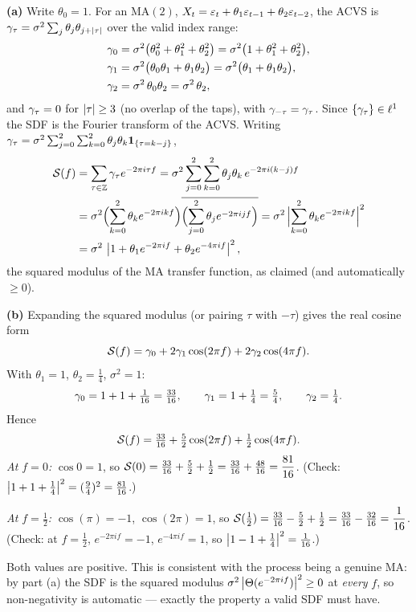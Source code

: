 \documentclass[11pt]{article}
\begin{document}
\textbf{(a)} Write $\theta_0=1$. For an $\mathrm{MA}(2)$, $X_t=\varepsilon_t+\theta_1\varepsilon_{t-1}+\theta_2\varepsilon_{t-2}$, the ACVS is $\gamma_\tau=\sigma^2\sum_{j}\theta_j\theta_{j+\left\lvert \tau \right\rvert}$ over the valid index range:
\[
\begin{aligned}
\gamma_0&=\sigma^2\bigl(\theta_0^2+\theta_1^2+\theta_2^2\bigr)=\sigma^2\bigl(1+\theta_1^2+\theta_2^2\bigr),\\
\gamma_1&=\sigma^2\bigl(\theta_0\theta_1+\theta_1\theta_2\bigr)=\sigma^2\bigl(\theta_1+\theta_1\theta_2\bigr),\\
\gamma_2&=\sigma^2\,\theta_0\theta_2=\sigma^2\,\theta_2,
\end{aligned}
\]
and $\gamma_\tau=0$ for $\left\lvert \tau \right\rvert\ge3$ (no overlap of the taps), with $\gamma_{-\tau}=\gamma_\tau$. Since $\{\gamma_\tau\}\in\ell^1$ the SDF is the Fourier transform of the ACVS. Writing $\gamma_\tau=\sigma^2\sum_{j=0}^{2}\sum_{k=0}^{2}\theta_j\theta_k\mathbf{1}_{\{\tau=k-j\}}$,
\[
\begin{aligned}
\mathcal{S}(f)&=\sum_{\tau\in\mathbb{Z}}\gamma_\tau e^{-2\pi i\tau f}
=\sigma^2\sum_{j=0}^{2}\sum_{k=0}^{2}\theta_j\theta_k\,e^{-2\pi i(k-j)f}\\
&=\sigma^2\Bigl(\sum_{k=0}^{2}\theta_k e^{-2\pi i k f}\Bigr)\overline{\Bigl(\sum_{j=0}^{2}\theta_j e^{-2\pi i j f}\Bigr)}
=\sigma^2\,\Bigl|\sum_{k=0}^{2}\theta_k e^{-2\pi i k f}\Bigr|^2\\
&=\sigma^2\,\left\lvert 1+\theta_1 e^{-2\pi i f}+\theta_2 e^{-4\pi i f} \right\rvert^2 ,
\end{aligned}
\]
the squared modulus of the MA transfer function, as claimed (and automatically $\ge0$).

\textbf{(b)} Expanding the squared modulus (or pairing $\tau$ with $-\tau$) gives the real cosine form
\[
\mathcal{S}(f)=\gamma_0+2\gamma_1\cos(2\pi f)+2\gamma_2\cos(4\pi f).
\]
With $\theta_1=1$, $\theta_2=\tfrac14$, $\sigma^2=1$:
\[
\gamma_0=1+1+\tfrac1{16}=\tfrac{33}{16},\qquad
\gamma_1=1+\tfrac14=\tfrac54,\qquad
\gamma_2=\tfrac14 .
\]
Hence
\[
\mathcal{S}(f)=\tfrac{33}{16}+\tfrac52\cos(2\pi f)+\tfrac12\cos(4\pi f).
\]
\emph{At $f=0$:} $\cos0=1$, so $\mathcal{S}(0)=\tfrac{33}{16}+\tfrac52+\tfrac12=\tfrac{33}{16}+\tfrac{48}{16}=\dfrac{81}{16}$. (Check: $\left\lvert 1+1+\tfrac14 \right\rvert^2=(\tfrac94)^2=\tfrac{81}{16}$.)

\emph{At $f=\tfrac12$:} $\cos(\pi)=-1$, $\cos(2\pi)=1$, so $\mathcal{S}(\tfrac12)=\tfrac{33}{16}-\tfrac52+\tfrac12=\tfrac{33}{16}-\tfrac{32}{16}=\dfrac{1}{16}$. (Check: at $f=\tfrac12$, $e^{-2\pi i f}=-1$, $e^{-4\pi i f}=1$, so $\left\lvert 1-1+\tfrac14 \right\rvert^2=\tfrac1{16}$.)

Both values are positive. This is consistent with the process being a genuine MA: by part (a) the SDF is the squared modulus $\sigma^2\left\lvert \Theta(e^{-2\pi i f}) \right\rvert^2\ge0$ at \emph{every} $f$, so non-negativity is automatic --- exactly the property a valid SDF must have.
\end{document}
